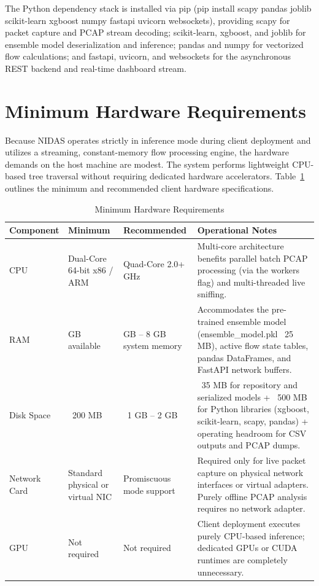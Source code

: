 \documentclass[12pt,a4paper]{report}
\begin{document}
The Python dependency stack is installed via pip (pip install scapy pandas joblib scikit-learn xgboost numpy fastapi uvicorn websockets), providing scapy for packet capture and PCAP stream decoding; scikit-learn, xgboost, and joblib for ensemble model deserialization and inference; pandas and numpy for vectorized flow calculations; and fastapi, uvicorn, and websockets for the asynchronous REST backend and real-time dashboard stream.

\section{Minimum Hardware Requirements}

Because NIDAS operates strictly in inference mode during client deployment and utilizes a streaming, constant-memory flow processing engine, the hardware demands on the host machine are modest. The system performs lightweight CPU-based tree traversal without requiring dedicated hardware accelerators. Table~\ref{tab:hardware_requirements} outlines the minimum and recommended client hardware specifications.

\begin{table}[H]
\centering
\small
\renewcommand{\arraystretch}{1.2}
\begin{tabularx}{\textwidth}{|>{\raggedright\arraybackslash}p{2.3cm}|>{\raggedright\arraybackslash}p{2.5cm}|>{\raggedright\arraybackslash}p{2.7cm}|>{\raggedright\arraybackslash}X|}
\hline
\textbf{Component} & \textbf{Minimum} & \textbf{Recommended} & \textbf{Operational Notes} \\
\hline
CPU & Dual-Core 64-bit x86 / ARM & Quad-Core 2.0+ GHz & Multi-core architecture benefits parallel batch PCAP processing (via the workers flag) and multi-threaded live sniffing. \\
\hline
RAM & 2 GB available & 4 GB -- 8 GB system memory & Accommodates the pre-trained ensemble model (ensemble\_model.pkl ~25 MB), active flow state tables, pandas DataFrames, and FastAPI network buffers. \\
\hline
Disk Space & ~200 MB & ~1 GB -- 2 GB & ~35 MB for repository and serialized models + ~500 MB for Python libraries (xgboost, scikit-learn, scapy, pandas) + operating headroom for CSV outputs and PCAP dumps. \\
\hline
Network Card & Standard physical or virtual NIC & Promiscuous mode support & Required only for live packet capture on physical network interfaces or virtual adapters. Purely offline PCAP analysis requires no network adapter. \\
\hline
GPU & Not required & Not required & Client deployment executes purely CPU-based inference; dedicated GPUs or CUDA runtimes are completely unnecessary. \\
\hline
\end{tabularx}
\caption{Minimum Hardware Requirements}
\label{tab:hardware_requirements}
\end{table}
\end{document}
